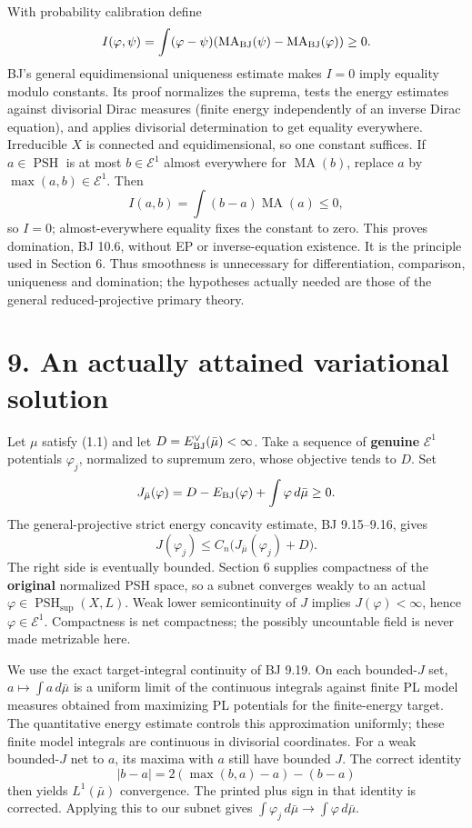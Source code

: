 \documentclass[
  10pt,
]{article}
\begin{document}
With probability calibration define \[I(\varphi,\psi)=\int(\varphi-\psi)
       (\operatorname{MA}_{\rm BJ}(\psi)-\operatorname{MA}_{\rm BJ}(\varphi))\ge0.\]
BJ's general equidimensional uniqueness estimate makes \(I=0\) imply
equality modulo constants. Its proof normalizes the suprema, tests the
energy estimates against divisorial Dirac measures (finite energy
independently of an inverse Dirac equation), and applies divisorial
determination to get equality everywhere. Irreducible \(X\) is connected
and equidimensional, so one constant suffices. If
\(a\in\operatorname{PSH}\) is at most \(b\in\mathcal E^1\) almost
everywhere for \(\operatorname{MA}(b)\), replace \(a\) by
\(\max(a,b)\in\mathcal E^1\). Then
\[I(a,b)=\int(b-a)\operatorname{MA}(a)\le0,\] so \(I=0\);
almost-everywhere equality fixes the constant to zero. This proves
domination, BJ 10.6, without EP or inverse-equation existence. It is the
principle used in Section 6. Thus smoothness is unnecessary for
differentiation, comparison, uniqueness and domination; the hypotheses
actually needed are those of the general reduced-projective primary
theory.

\section{9. An actually attained variational
solution}\label{an-actually-attained-variational-solution}

Let \(\mu\) satisfy (1.1) and let
\(D=E_{\rm BJ}^{\vee}(\bar\mu)<\infty\). Take a sequence of
\textbf{genuine} \(\mathcal E^1\) potentials \(\varphi_j\), normalized
to supremum zero, whose objective tends to \(D\). Set
\[J_{\bar\mu}(\varphi)=D-E_{\rm BJ}(\varphi)+\int\varphi\,d\bar\mu\ge0.\]
The general-projective strict energy concavity estimate, BJ 9.15--9.16,
gives \[J(\varphi_j)\le C_n\bigl(J_{\bar\mu}(\varphi_j)+D\bigr).\] The
right side is eventually bounded. Section 6 supplies compactness of the
\textbf{original} normalized PSH space, so a subnet converges weakly to
an actual \(\varphi\in\operatorname{PSH}_{\sup}(X,L)\). Weak lower
semicontinuity of \(J\) implies \(J(\varphi)<\infty\), hence
\(\varphi\in\mathcal E^1\). Compactness is net compactness; the possibly
uncountable field is never made metrizable here.

We use the exact target-integral continuity of BJ 9.19. On each
bounded-\(J\) set, \(a\mapsto\int a\,d\bar\mu\) is a uniform limit of
the continuous integrals against finite PL model measures obtained from
maximizing PL potentials for the finite-energy target. The quantitative
energy estimate controls this approximation uniformly; these finite
model integrals are continuous in divisorial coordinates. For a weak
bounded-\(J\) net to \(a\), its maxima with \(a\) still have bounded
\(J\). The correct identity \[|b-a|=2(\max(b,a)-a)-(b-a)\] then yields
\(L^1(\bar\mu)\) convergence. The printed plus sign in that identity is
corrected. Applying this to our subnet gives
\(\int\varphi_j\,d\bar\mu\to\int\varphi\,d\bar\mu\).
\end{document}
